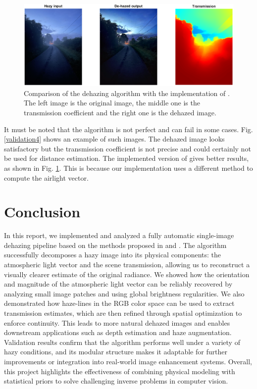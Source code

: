 \documentclass[conference]{IEEEtran}
\begin{document}
\begin{figure}
    \centering
    \includegraphics[width=\linewidth]{img/validation5.png}
    \caption{Comparison of the dehazing algorithm with the implementation of \cite{github}. The left image is the original image, the middle one is the transmission coefficient and the right one is the dehazed image.}
    \label{validation5}
\end{figure}

It must be noted that the algorithm is not perfect and can fail in some cases. Fig. \ref{validation4} shows an example of such images. The dehazed image looks satisfactory but the transmission coefficient is not precise and could certainly not be used for distance estimation. The implemented version of \cite{github} gives better results, as shown in Fig. \ref{validation5}. This is because our implementation uses a different method to compute the airlight vector.

\section{Conclusion}

In this report, we implemented and analyzed a fully automatic single-image dehazing pipeline based on the methods proposed in \cite{airlight} and \cite{dehaze}. The algorithm successfully decomposes a hazy image into its physical components: the atmospheric light vector and the scene transmission, allowing us to reconstruct a visually clearer estimate of the original radiance.
We showed how the orientation and magnitude of the atmospheric light vector can be reliably recovered by analyzing small image patches and using global brightness regularities. We also demonstrated how haze-lines in the RGB color space can be used to extract transmission estimates, which are then refined through spatial optimization to enforce continuity. This leads to more natural dehazed images and enables downstream applications such as depth estimation and haze augmentation.
Validation results confirm that the algorithm performs well under a variety of hazy conditions, and its modular structure makes it adaptable for further improvements or integration into real-world image enhancement systems. Overall, this project highlights the effectiveness of combining physical modeling with statistical priors to solve challenging inverse problems in computer vision.
\end{document}
